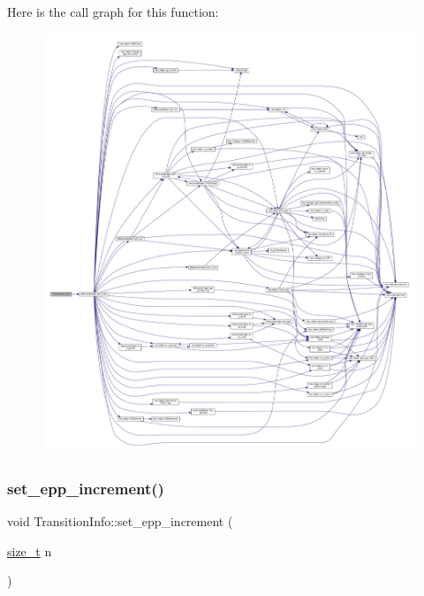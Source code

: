 Here is the call graph for this function\+:
\nopagebreak
\begin{figure}[H]
\begin{center}
\leavevmode
\includegraphics[width=350pt]{d7/db9/classTransitionInfo_a18cd68a222a448e60629d658803b9cf6_cgraph}
\end{center}
\end{figure}
\mbox{\label{classTransitionInfo_a12bd8feabc20ab2d67d16faa9319cd80}} 
\subsubsection{\texorpdfstring{set\+\_\+epp\+\_\+increment()}{set\_epp\_increment()}}
{\footnotesize\ttfamily void Transition\+Info\+::set\+\_\+epp\+\_\+increment (\begin{DoxyParamCaption}\item[{\hyperlink{tutorial__fpt__2017_2intro_2sixth_2test_8c_a7c94ea6f8948649f8d181ae55911eeaf}{size\+\_\+t}}]{n }\end{DoxyParamCaption})\hspace{0.3cm}{\ttfamily [inline]}}




